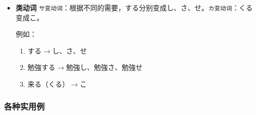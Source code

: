 \begin{itemize}
\begin{multicols}{2}
    \end{multicols}


    \item {\bfseries \III 类动词} {\texttt{サ变动词}}：根据不同的需要，する分别变成し、さ、せ。\texttt{カ变动词}：くる变成こ。
    
    例如：
    \begin{multicols}{2}
        \begin{enumerate}
            \item する$\longrightarrow$し、さ、せ
            \item 勉強する$\longrightarrow$勉強し、勉強さ、勉強せ
            \item 来る（くる）$\longrightarrow$こ
        \end{enumerate}

    \end{multicols}
    
\end{itemize}

\subsubsection{各种实用例}

